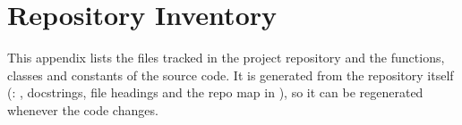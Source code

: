 \section{Repository Inventory}

This appendix lists the files tracked in the project repository and the functions, classes and
constants of the source code. It is generated from the repository itself
(: , docstrings, file headings and the repo map in
), so it can be regenerated whenever the code changes.


